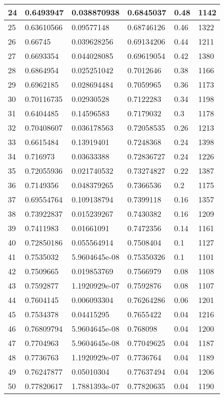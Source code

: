 \begin{longtable}{|l|l|l|l|l|l|}
24 & 0.6493947 & 0.038870938 & 0.6845037 & 0.48 & 1142 \\ \hline 
25 & 0.63610566 & 0.09577148 & 0.68746126 & 0.46 & 1322 \\ \hline 
26 & 0.66745 & 0.039628256 & 0.69134206 & 0.44 & 1211 \\ \hline 
27 & 0.6693354 & 0.044028085 & 0.69619054 & 0.42 & 1380 \\ \hline 
28 & 0.6864954 & 0.025251042 & 0.7012646 & 0.38 & 1166 \\ \hline 
29 & 0.6962185 & 0.028694484 & 0.7059965 & 0.36 & 1173 \\ \hline 
30 & 0.70116735 & 0.02930528 & 0.7122283 & 0.34 & 1198 \\ \hline 
31 & 0.6404485 & 0.14596583 & 0.7179032 & 0.3 & 1178 \\ \hline 
32 & 0.70408607 & 0.036178563 & 0.72058535 & 0.26 & 1213 \\ \hline 
33 & 0.6615484 & 0.13919401 & 0.7248368 & 0.24 & 1398 \\ \hline 
34 & 0.716973 & 0.03633388 & 0.72836727 & 0.24 & 1226 \\ \hline 
35 & 0.72055936 & 0.021740532 & 0.73274827 & 0.22 & 1387 \\ \hline 
36 & 0.7149356 & 0.048379265 & 0.7366536 & 0.2 & 1175 \\ \hline 
37 & 0.69554764 & 0.109138794 & 0.7399118 & 0.16 & 1357 \\ \hline 
38 & 0.73922837 & 0.015239267 & 0.7430382 & 0.16 & 1209 \\ \hline 
39 & 0.7411983 & 0.01661091 & 0.7472356 & 0.14 & 1161 \\ \hline 
40 & 0.72850186 & 0.055564914 & 0.7508404 & 0.1 & 1127 \\ \hline 
41 & 0.7535032 & 5.9604645e-08 & 0.75350326 & 0.1 & 1101 \\ \hline 
42 & 0.7509665 & 0.019853769 & 0.7566979 & 0.08 & 1108 \\ \hline 
43 & 0.7592877 & 1.1920929e-07 & 0.7592876 & 0.08 & 1107 \\ \hline 
44 & 0.7604145 & 0.006093304 & 0.76264286 & 0.06 & 1201 \\ \hline 
45 & 0.7534378 & 0.04415295 & 0.7655422 & 0.04 & 1216 \\ \hline 
46 & 0.76809794 & 5.9604645e-08 & 0.768098 & 0.04 & 1200 \\ \hline 
47 & 0.7704963 & 5.9604645e-08 & 0.77049625 & 0.04 & 1187 \\ \hline 
48 & 0.7736763 & 1.1920929e-07 & 0.7736764 & 0.04 & 1189 \\ \hline 
49 & 0.76247877 & 0.05010304 & 0.77637494 & 0.04 & 1206 \\ \hline 
50 & 0.77820617 & 1.7881393e-07 & 0.77820635 & 0.04 & 1190 \\ \hline 
\end{longtable}